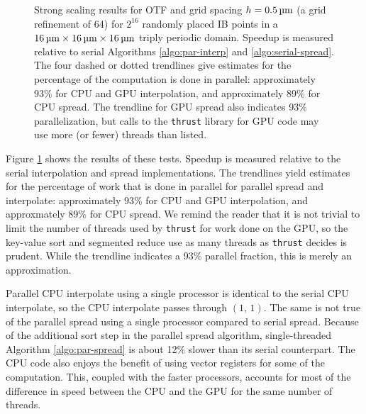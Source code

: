 \begin{figure}[h]
\caption{%
    Strong scaling results for OTF and grid spacing $h = 0.5\um$ (a grid
    refinement of 64) for $2^{16}$ randomly placed IB points in a
    $16\um\times16\um\times16\um$ triply periodic domain. Speedup is measured
    relative to serial Algorithms \ref{algo:par-interp} and
    \ref{algo:serial-spread}. The four dashed or dotted trendlines give
    estimates for the percentage of the computation is done in parallel:
    approximately 93\% for CPU and GPU interpolation, and approximately 89\%
    for CPU spread. The trendline for GPU spread also indicates 93\%
    parallelization, but calls to the \texttt{thrust} library for GPU code may
    use more (or fewer) threads than listed.
}
\label{fig:unstructured-strong}
\end{figure}

Figure \ref{fig:unstructured-strong} shows the results of these tests. Speedup
is measured relative to the serial interpolation and spread implementations.
The trendlines yield estimates for the percentage of work that is done in
parallel for parallel spread and interpolate: approximately 93\% for CPU and
GPU interpolation, and approxmately 89\% for CPU spread. {\color{red} We remind
the reader that it is not trivial to limit the number of threads used by
\texttt{thrust} for work done on the GPU, so the key-value sort and segmented
reduce use as many threads as \texttt{thrust} decides is prudent. While the
trendline indicates a 93\% parallel fraction, this is merely an approximation.}

Parallel CPU interpolate using a single processor is identical to the serial
CPU interpolate, so the CPU interpolate passes through $(1,\,1)$. The same is
not true of the parallel spread using a single processor compared to serial
spread. Because of the additional sort step in the parallel spread algorithm,
single-threaded Algorithm \ref{algo:par-spread} is about 12\% slower than its
serial counterpart. The CPU code also enjoys the benefit of using vector
registers for some of the computation. {\color{red}This, coupled with the
faster processors, accounts for most of the difference in speed between the CPU
and the GPU for the same number of threads.}

